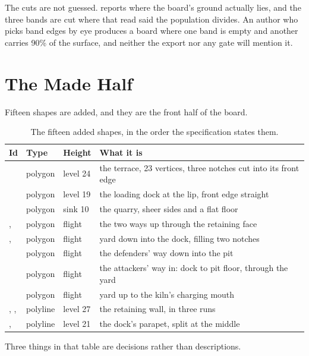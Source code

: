 The cuts are not guessed.  reports where the
board's ground actually lies, and the three bands are cut where that read said
the population divides. An author who picks band edges by eye produces a board
where one band is empty and another carries 90\% of the surface, and neither
the export nor any gate will mention it.

\section{The Made Half}

Fifteen shapes are added, and they are the front half of the board.

\begin{table}[htbp]
\caption{The fifteen added shapes, in the order the specification states them.}
\label{tab:whitegape-shapes}
\small
\begin{tabularx}{\textwidth}{L{2.4cm} L{1.9cm} L{1.9cm} Y}
\toprule
\textbf{Id} & \textbf{Type} & \textbf{Height} & \textbf{What it is} \\
\midrule
{} & polygon & level 24 & the terrace, 23 vertices, three notches cut into its front edge \\
 & polygon & level 19 & the loading dock at the lip, front edge straight \\
 & polygon & sink 10 & the quarry, sheer sides and a flat floor \\
,  & polygon & flight & the two ways up through the retaining face \\
,  & polygon & flight & yard down into the dock, filling two notches \\
 & polygon & flight & the defenders' way down into the pit \\
 & polygon & flight & the attackers' way in: dock to pit floor, through the yard \\
 & polygon & flight & yard up to the kiln's charging mouth \\
, ,  & polyline & level 27 & the retaining wall, in three runs \\
,  & polyline & level 21 & the dock's parapet, split at the middle \\
\bottomrule
\end{tabularx}
\end{table}

Three things in that table are decisions rather than descriptions.

